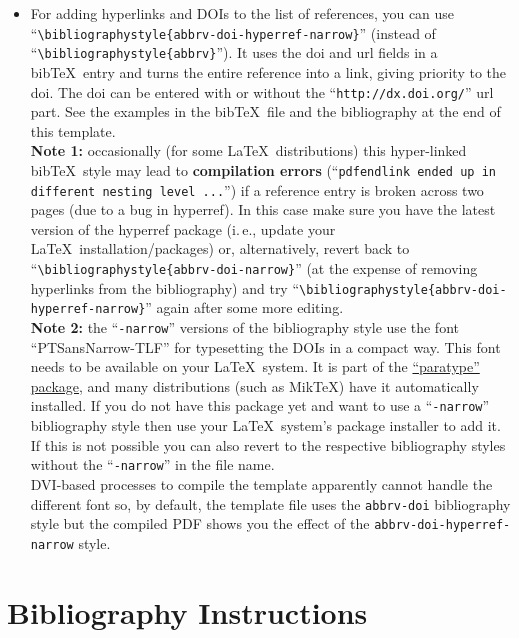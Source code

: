 \documentclass[journal]{vgtc}                %
\begin{document}
\begin{itemize}
\item For adding hyperlinks and DOIs to the list of references, you can use ``\texttt{\textbackslash bibliographystyle\{abbrv-doi-hyperref-narrow\}}'' (instead of ``\texttt{\textbackslash bibliographystyle\{abbrv\}}''). It uses the doi and url fields in a bib\TeX\ entry and turns the entire reference into a link, giving priority to the doi. The doi can be entered with or without the ``\texttt{http://dx.doi.org/}'' url part. See the examples in the bib\TeX\ file and the bibliography at the end of this template.\\[1em]
\textbf{Note 1:} occasionally (for some \LaTeX\ distributions) this hyper-linked bib\TeX\ style may lead to \textbf{compilation errors} (``\texttt{pdfendlink ended up in different nesting level ...}'') if a reference entry is broken across two pages (due to a bug in hyperref). In this case make sure you have the latest version of the hyperref package (i.\,e., update your \LaTeX\ installation/packages) or, alternatively, revert back to ``\texttt{\textbackslash bibliographystyle\{abbrv-doi-narrow\}}'' (at the expense of removing hyperlinks from the bibliography) and try ``\texttt{\textbackslash bibliographystyle\{abbrv-doi-hyperref-narrow\}}'' again after some more editing.\\[1em]
\textbf{Note 2:} the ``\texttt{-narrow}'' versions of the bibliography style use the font ``PTSansNarrow-TLF'' for typesetting the DOIs in a compact way. This font needs to be available on your \LaTeX\ system. It is part of the \href{https://www.ctan.org/pkg/paratype}{``paratype'' package}, and many distributions (such as MikTeX) have it automatically installed. If you do not have this package yet and want to use a ``\texttt{-narrow}'' bibliography style then use your \LaTeX\ system's package installer to add it. If this is not possible you can also revert to the respective bibliography styles without the ``\texttt{-narrow}'' in the file name.\\[1em]
DVI-based processes to compile the template apparently cannot handle the different font so, by default, the template file uses the \texttt{abbrv-doi} bibliography style but the compiled PDF shows you the effect of the \texttt{abbrv-doi-hyperref-narrow} style.
\end{itemize}

\section{Bibliography Instructions}
\end{document}
